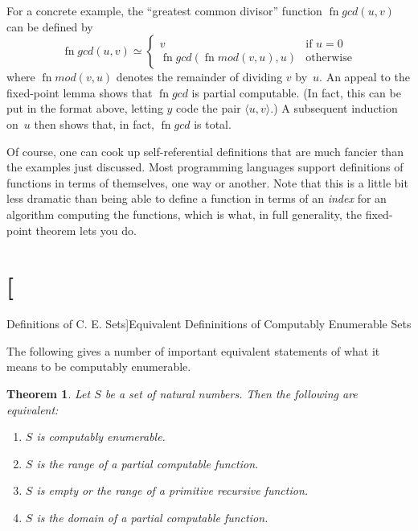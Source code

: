 \documentclass[10pt,a4paper]{article}
\theoremstyle{plain}
\newtheorem{thm}{Theorem}[section]
\theoremstyle{definition}
\theoremstyle{remark}
\newcommand*{\olfileid}[3]{}
\newcommand*{\olsection}[1]{\section*{#1}}
\newcommand*{\ollabel}[1]{\label{#1}}
\providecommand{\tuple}[1]{\langle #1 \rangle}
\providecommand{\fn}{\operatorname{fn}}
\begin{document}
For a concrete example, the ``greatest common divisor'' function
$\fn{gcd}(u,v)$ can be defined by
\[
\fn{gcd}(u,v) \simeq
\begin{cases}
v & \text{if $u = 0$} \\
\fn{gcd}(\fn{mod}(v, u), u) & \text{otherwise}
\end{cases}
\]
where $\fn{mod}(v, u)$ denotes the remainder of dividing $v$
by~$u$. An appeal to the fixed-point lemma shows that $\fn{gcd}$ is
partial computable. (In fact, this can be put in the format above,
letting $y$ code the pair $\tuple{u, v}$.) A subsequent induction
on~$u$ then shows that, in fact, $\fn{gcd}$ is total.

Of course, one can cook up self-referential definitions that are much
fancier than the examples just discussed. Most programming languages
support definitions of functions in terms of themselves, one way or
another. Note that this is a little bit less dramatic than being able
to define a function in terms of an \emph{index} for an algorithm
computing the functions, which is what, in full generality, the
fixed-point theorem lets you do.





\olfileid{cmp}{thy}{eqc}

\olsection[Definitions of C. E. Sets]{Equivalent Defininitions of
  Computably Enumerable Sets}


The following gives a number of important equivalent statements of
what it means to be computably enumerable.

\begin{thm}
\ollabel{thm:ce-equiv}
Let $S$ be a set of natural numbers. Then the following are
equivalent:
\begin{enumerate}
\item\ollabel{case:ce} $S$ is computably enumerable.
\item\ollabel{case:ran-pc} $S$ is the range of a \emph{partial} computable function.
\item\ollabel{case:ran-prim} $S$ is empty or the range of a primitive recursive function.
\item\ollabel{case:ce-domain} $S$ is the \emph{domain} of a partial computable function.
\end{enumerate}
\end{thm}
\end{document}

